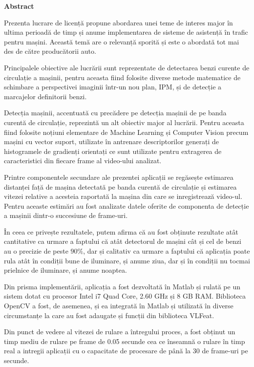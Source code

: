 \thispagestyle{plain}

\begin{center}
	\Large \textbf{Abstract}	
\end{center}

Prezenta lucrare de licență propune abordarea unei teme de interes major în ultima perioadă de timp și anume implementarea de sisteme de asistență în trafic pentru mașini. Această temă are o relevanță sporită și este o abordată tot mai des de către producătorii auto. 

Principalele obiective ale lucrării sunt reprezentate de detectarea benzi curente de circulație a mașinii, pentru aceasta fiind folosite diverse metode matematice de schimbare a perspectivei imaginii într-un nou plan, IPM, și de detecție a marcajelor definitorii benzi.

Detecția mașinii, accentuată cu precădere pe detecția mașinii de pe banda curentă de circulație, reprezintă un alt obiectiv major al lucrării. Pentru aceasta fiind folosite noțiuni elementare de Machine Learning și Computer Vision precum mașini cu vector suport, utilizate în antrenare descriptorilor generați de histogramele de gradienți orientați ce sunt utilizate pentru extragerea de caracteristici din fiecare frame al video-ului analizat.

Printre componentele secundare ale prezentei aplicații se regăsește estimarea distanței față de mașina detectată pe banda curentă de circulație și estimarea vitezei relative a acesteia raportată la mașina din care se inregistrează video-ul. 
Pentru aceaste estimări au fost analizate datele oferite de componenta de detecție a mașinii dintr-o succesiune de frame-uri.

În ceea ce privește rezultatele, putem afirma că au fost obținute rezultate atât cantitative ca urmare a faptului că atât detectorul de mașini cât și cel de benzi au o precizie de peste $90\%$, dar și calitativ ca urmare a faptului că aplicația poate rula atât în condiții bune de iluminare, și anume ziua, dar și în condiții nu tocmai prielnice de iluminare, și anume noaptea.

Din prisma implementării, aplicația a fost dezvoltată în Matlab și rulată pe un sistem dotat cu procesor Intel i7 Quad Core, 2.60 GHz și 8 GB RAM. Biblioteca OpenCV a fost, de asemenea, și ea integrată în Matlab și utilizată în diverse circumstanțe la care au fost adaugate și funcții din biblioteca VLFeat.

Din punct de vedere al vitezei de rulare a întregului proces, a fost obținut un timp mediu de rulare pe frame de 0.05 secunde cea ce înseamnă o rulare în timp real a intregii aplicații cu o capacitate de procesare de până la 30 de frame-uri pe secunde.  
\vspace*{\fill}